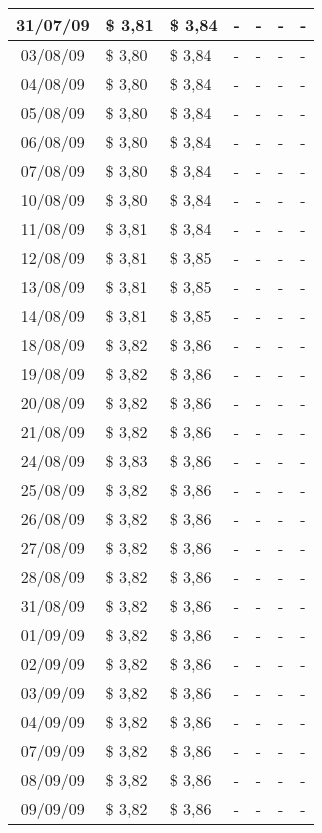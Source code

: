 \begin{center}
\begin{longtable}{|c|p{1.5cm}|p{1.5cm}|p{1.5cm}|p{1.5cm}|p{1.5cm}|p{1.5cm}|}
31/07/09 & \$ 3,81 & \$ 3,84 & - & - & - & - \\ \hline
03/08/09 & \$ 3,80 & \$ 3,84 & - & - & - & - \\ \hline
04/08/09 & \$ 3,80 & \$ 3,84 & - & - & - & - \\ \hline
05/08/09 & \$ 3,80 & \$ 3,84 & - & - & - & - \\ \hline
06/08/09 & \$ 3,80 & \$ 3,84 & - & - & - & - \\ \hline
07/08/09 & \$ 3,80 & \$ 3,84 & - & - & - & - \\ \hline
10/08/09 & \$ 3,80 & \$ 3,84 & - & - & - & - \\ \hline
11/08/09 & \$ 3,81 & \$ 3,84 & - & - & - & - \\ \hline
12/08/09 & \$ 3,81 & \$ 3,85 & - & - & - & - \\ \hline
13/08/09 & \$ 3,81 & \$ 3,85 & - & - & - & - \\ \hline
14/08/09 & \$ 3,81 & \$ 3,85 & - & - & - & - \\ \hline
18/08/09 & \$ 3,82 & \$ 3,86 & - & - & - & - \\ \hline
19/08/09 & \$ 3,82 & \$ 3,86 & - & - & - & - \\ \hline
20/08/09 & \$ 3,82 & \$ 3,86 & - & - & - & - \\ \hline
21/08/09 & \$ 3,82 & \$ 3,86 & - & - & - & - \\ \hline
24/08/09 & \$ 3,83 & \$ 3,86 & - & - & - & - \\ \hline
25/08/09 & \$ 3,82 & \$ 3,86 & - & - & - & - \\ \hline
26/08/09 & \$ 3,82 & \$ 3,86 & - & - & - & - \\ \hline
27/08/09 & \$ 3,82 & \$ 3,86 & - & - & - & - \\ \hline
28/08/09 & \$ 3,82 & \$ 3,86 & - & - & - & - \\ \hline
31/08/09 & \$ 3,82 & \$ 3,86 & - & - & - & - \\ \hline
01/09/09 & \$ 3,82 & \$ 3,86 & - & - & - & - \\ \hline
02/09/09 & \$ 3,82 & \$ 3,86 & - & - & - & - \\ \hline
03/09/09 & \$ 3,82 & \$ 3,86 & - & - & - & - \\ \hline
04/09/09 & \$ 3,82 & \$ 3,86 & - & - & - & - \\ \hline
07/09/09 & \$ 3,82 & \$ 3,86 & - & - & - & - \\ \hline
08/09/09 & \$ 3,82 & \$ 3,86 & - & - & - & - \\ \hline
09/09/09 & \$ 3,82 & \$ 3,86 & - & - & - & - \\ \hline

\end{longtable}
\end{center}
